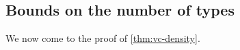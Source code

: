 \subsection{Bounds on the number of types}%

We now come to the proof of \autoref{thm:vc-density}.
%
%
%
